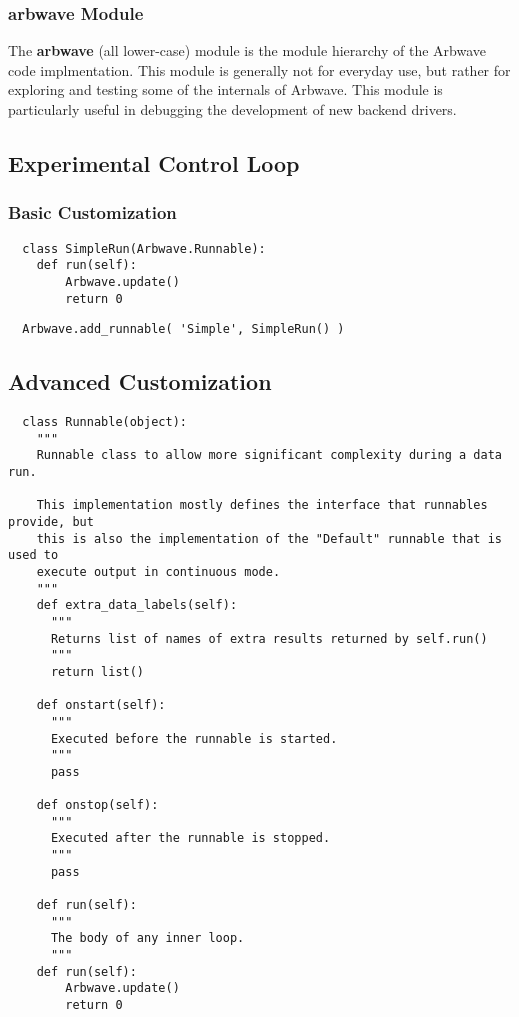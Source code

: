\subsubsection{\textbf{arbwave} Module}
The \textbf{arbwave} (all lower-case) module is the module hierarchy of the
Arbwave code implmentation.  This module is generally not for everyday use, but
rather for exploring and testing some of the internals of Arbwave.  This module
is particularly useful in debugging the development of new backend drivers.


\subsection{Experimental Control Loop}\label{sec:scripting:runnable}
\subsubsection{Basic Customization}\label{sec:scripting:simple}

\begin{lstlisting}
  class SimpleRun(Arbwave.Runnable):
  	def run(self):
  		Arbwave.update()
  		return 0
\end{lstlisting}


\begin{lstlisting}
  Arbwave.add_runnable( 'Simple', SimpleRun() )
\end{lstlisting}

\subsection{Advanced Customization}

\begin{lstlisting}
  class Runnable(object):
    """
    Runnable class to allow more significant complexity during a data run.
  
    This implementation mostly defines the interface that runnables provide, but
    this is also the implementation of the "Default" runnable that is used to
    execute output in continuous mode.
    """
    def extra_data_labels(self):
      """
      Returns list of names of extra results returned by self.run()
      """
      return list()
  
    def onstart(self):
      """
      Executed before the runnable is started.
      """
      pass
  
    def onstop(self):
      """
      Executed after the runnable is stopped.
      """
      pass
  
    def run(self):
      """
      The body of any inner loop.
      """
  	def run(self):
  		Arbwave.update()
  		return 0
\end{lstlisting}

